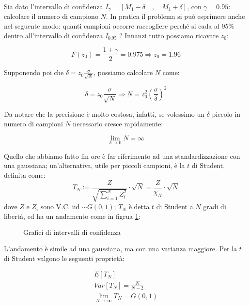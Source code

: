 \begin{esempio} %
Sia dato l'intervallo di confidenza $I_\gamma=\left[ M_1-\delta \quad ,\quad M_1+\delta \right] $, con $\gamma=0.95$: calcolare il numero di campiono $N$. In pratica il problema si può esprimere anche nel seguente modo: quanti campioni occorre raccogliere perché si cada al 95\% dentro all'intervallo di confidenza $I_{0.95}$ ?\newline
Innanzi tutto possiamo ricavare $z_0$:

  \[ F(z_0)=\frac{1+\gamma}{2}=0.975 \Longrightarrow z_0=1.96 \]
  
Supponendo poi che $\delta=z_0\frac{\sigma}{\sqrt{N}}$, possiamo calcolare $N$ come:

  \[ \delta=z_0\frac{\sigma}{\sqrt{N}} \Longrightarrow N=z_0^2\left( \frac{\sigma}{\delta}\right) ^2 \]
  
Da notare che la precisione è molto costosa, infatti, se volessimo un $\delta$ piccolo in numero di campioni $N$ necessario cresce rapidamente:

\[ \lim_{\delta \rightarrow 0} {N}=\infty \]
\end{esempio}


Quello che abbiamo fatto fin ore è far riferimento ad una standardizzazione con una gaussiana; un'alternativa, utile per piccoli campioni, è la $t$ di Student, definita come:
\[ T_N:=\frac{Z}{\sqrt{\sum_{i=1}^{N}Z_i^2}} \cdot \sqrt{N}=\frac{Z}{\chi_N} \cdot \sqrt{N} \]
dove $Z$ e $Z_i$ sono V.C. iid $\sim G(0,1)$; $T_N$ è detta $t$ di Student a $N$ gradi di libertà, ed ha un andamento come in figrua \ref{fig:grafIntConfTstud}:
  \begin{figure}[htbp]
    \centering
    \caption{Grafici di intervalli di confidenza \label{fig:grafIntConfTstud}}
  \end{figure}
L'andamento è simile ad una gaussiana, ma con una varianza maggiore. Per la $t$ di Student valgono le seguenti proprietà:

  \begin{gather*}
    E[T_N]\\
    Var[T_N]=\frac{N}{N-2}\\
    \lim_{N\rightarrow \infty} T_N = G(0,1)
  \end{gather*}
